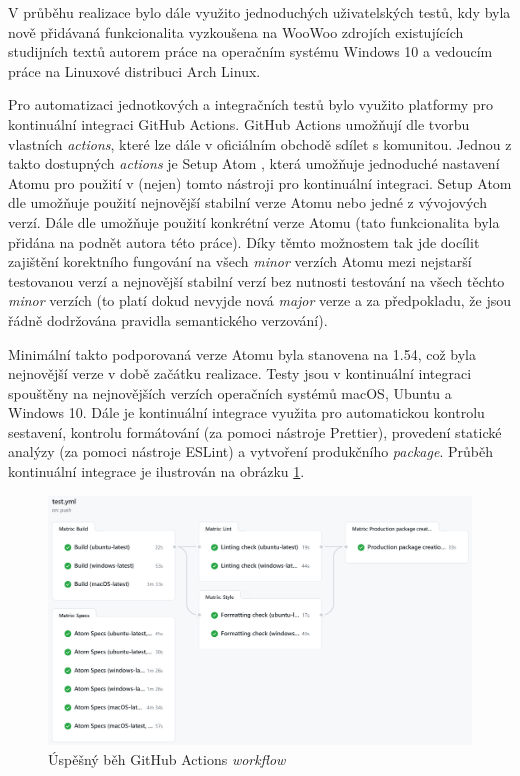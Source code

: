 V průběhu realizace bylo dále využito jednoduchých uživatelských testů, kdy byla nově přidávaná funkcionalita vyzkoušena
na WooWoo zdrojích existujících studijních textů autorem práce na operačním systému Windows 10 a vedoucím práce na
Linuxové distribuci Arch Linux.

Pro automatizaci jednotkových a integračních testů bylo využito platformy pro kontinuální integraci GitHub Actions.
GitHub Actions umožňují dle \cite{gh-actions} tvorbu vlastních \textit{actions}, které lze dále v oficiálním \uv
{obchodě} sdílet s komunitou. Jednou z takto dostupných \textit{actions} je Setup Atom \cite{github-action-setup-atom},
která umožňuje jednoduché nastavení Atomu pro použití v (nejen) tomto nástroji pro kontinuální integraci. Setup Atom dle
\cite{github-action-setup-atom} umožňuje použití nejnovější stabilní verze Atomu nebo jedné z vývojových verzí. Dále dle
\cite{github-action-setup-atom} umožňuje použití konkrétní verze Atomu (tato funkcionalita byla přidána na podnět autora
této práce). Díky těmto možnostem tak jde docílit zajištění korektního fungování na všech \textit{minor} verzích Atomu
mezi nejstarší testovanou verzí a nejnovější stabilní verzí bez nutnosti testování na všech těchto \textit{minor}
verzích (to platí dokud nevyjde nová \textit{major} verze a za předpokladu, že jsou řádně dodržována pravidla
semantického verzování).

Minimální takto podporovaná verze Atomu byla stanovena na 1.54, což byla nejnovější verze v době začátku realizace.
Testy jsou v kontinuální integraci spouštěny na nejnovějších verzích operačních systémů macOS, Ubuntu a Windows 10.
Dále je kontinuální integrace využita pro automatickou kontrolu sestavení, kontrolu formátování (za pomoci nástroje
Prettier), provedení statické analýzy (za pomoci nástroje ESLint) a vytvoření produkčního \textit{package}. Průběh
kontinuální integrace je ilustrován na obrázku \ref{testovani-ci}.

\begin{figure}\centering
    \includegraphics[width=1.0\textwidth]{content/realizace/testování-ci}
 	\caption[GitHub Actions \textit{workflow}]{Úspěšný běh GitHub Actions \textit{workflow}}
    \label{testovani-ci}
\end{figure}

